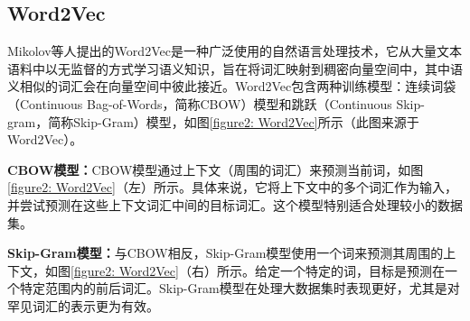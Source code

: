 \subsection[\hspace{-2pt}Word2Vec]{{\heiti{} \hspace{-8pt}Word2Vec}}\label{section2: Word2Vec}

Mikolov等人\cite{mikolov2013efficient, Word2Vec}提出的Word2Vec是一种广泛使用的自然语言处理技术，它从大量文本语料中以无监督的方式学习语义知识，旨在将词汇映射到稠密向量空间中，其中语义相似的词汇会在向量空间中彼此接近。Word2Vec包含两种训练模型：连续词袋（Continuous Bag-of-Words，简称CBOW）模型和跳跃（Continuous Skip-gram，简称Skip-Gram）模型，如图\ref{figure2: Word2Vec}所示（此图来源于Word2Vec\cite{Word2Vec}）。

\textbf{CBOW模型：}CBOW模型通过上下文（周围的词汇）来预测当前词，如图\ref{figure2: Word2Vec}（左）所示。具体来说，它将上下文中的多个词汇作为输入，并尝试预测在这些上下文词汇中间的目标词汇。这个模型特别适合处理较小的数据集。

\textbf{Skip-Gram模型：}与CBOW相反，Skip-Gram模型使用一个词来预测其周围的上下文，如图\ref{figure2: Word2Vec}（右）所示。给定一个特定的词，目标是预测在一个特定范围内的前后词汇。Skip-Gram模型在处理大数据集时表现更好，尤其是对罕见词汇的表示更为有效。

